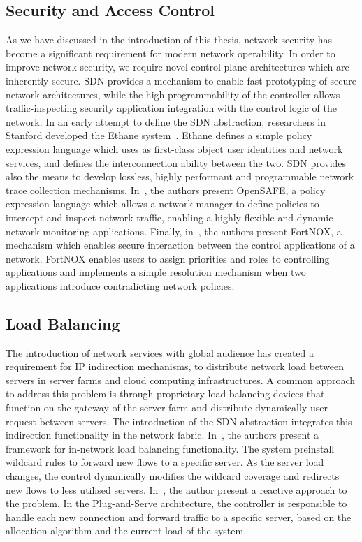 \subsection{Security and Access Control}

As we have discussed in the introduction of this thesis, network security has
become a significant requirement for modern network operability. In order to
improve network security, we require novel control plane architectures which are
inherently secure. SDN provides a mechanism to enable fast prototyping of secure
network architectures, while the high programmability of the controller allows
traffic-inspecting security application integration with the control logic of
the network.  In an early attempt to define the SDN abstraction, researchers in
Stanford developed the Ethane system~\cite{casado07:_Ethan}. Ethane defines a
simple policy expression language which uses as first-class object user
identities and network services, and defines the interconnection ability between
the two. SDN provides also the means to develop lossless, highly performant and
programmable network trace collection mechanisms. In~\cite{Ballard10}, the
authors present OpenSAFE, a policy expression language which allows a network
manager to define policies to intercept and inspect network traffic, enabling a
highly flexible and dynamic network monitoring applications. Finally,
in~\cite{Porras12}, the authors present FortNOX, a mechanism which enables
secure interaction between the control applications of a network. FortNOX
enables users to assign priorities and roles to controlling applications and
implements a simple resolution mechanism when two applications introduce
contradicting network policies. 
 
\subsection{Load Balancing}

The introduction of network services with global audience has created a
requirement for IP indirection mechanisms, to distribute network load between
servers in server farms and cloud computing infrastructures. A common approach
to address this problem is through proprietary load balancing devices that
function on the gateway of the server farm and distribute dynamically user
request between servers. The introduction of the SDN abstraction integrates this
indirection functionality in the network fabric.  In~\cite{Wang11}, the authors
present a framework for in-network load balancing functionality. The system
preinstall wildcard rules to forward new flows to a specific server. As the
server load changes, the control dynamically modifies the wildcard coverage and
redirects new flows to less utilised servers.  In~\cite{Handigol09,Handigol10},
the author present a reactive approach to the problem. In the Plug-and-Serve
architecture, the controller is responsible to handle each new connection and
forward traffic to a specific server, based on the allocation algorithm and the
current load of the system.

